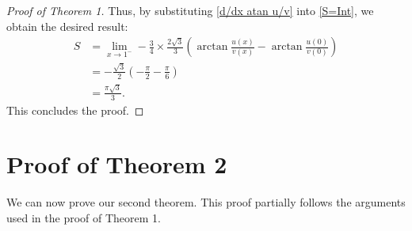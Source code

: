 \documentclass{amsart}
\numberwithin{equation}{section}
\begin{document}
\begin{proof}[Proof of Theorem 1]
    Thus, by substituting \eqref{d/dx atan u/v} into \eqref{S=Int}, we obtain the desired result:
    \begin{align*}
        S&=\lim_{x\to1^-}-\frac34\times\frac{2\sqrt3}{3}\left(\arctan\frac{u(x)}{v(x)}-\arctan\frac{u(0)}{v(0)}\right)\\
        &=-\frac{\sqrt{3}}{2}\left(-\frac{\pi}2-\frac\pi6\right)\\
        &=\frac{\pi\sqrt3}3.
    \end{align*}
    This concludes the proof.
\end{proof}
\section{Proof of Theorem 2}
We can now prove our second theorem. This proof partially follows the arguments used in the proof of Theorem 1.
\end{document}
